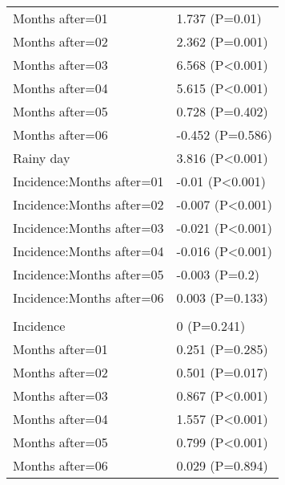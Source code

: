\documentclass[]{article}
\begin{document}
\begin{longtable}[t]{ll}
\hspace{1em}Months after=01 & 1.737 (P=0.01)\\
\hspace{1em}Months after=02 & 2.362 (P=0.001)\\
\hspace{1em}Months after=03 & 6.568 (P<0.001)\\
\hspace{1em}Months after=04 & 5.615 (P<0.001)\\
\hspace{1em}Months after=05 & 0.728 (P=0.402)\\
\hspace{1em}Months after=06 & -0.452 (P=0.586)\\
\hspace{1em}Rainy day & 3.816 (P<0.001)\\
\hspace{1em}Incidence:Months after=01 & -0.01 (P<0.001)\\
\hspace{1em}Incidence:Months after=02 & -0.007 (P<0.001)\\
\hspace{1em}Incidence:Months after=03 & -0.021 (P<0.001)\\
\hspace{1em}Incidence:Months after=04 & -0.016 (P<0.001)\\
\hspace{1em}Incidence:Months after=05 & -0.003 (P=0.2)\\
\hspace{1em}Incidence:Months after=06 & 0.003 (P=0.133)\\
\addlinespace[1.5em]
\multicolumn{2}{l}{\textbf{Temporary field worker}}\\
\hspace{1em}Incidence & 0 (P=0.241)\\
\hspace{1em}Months after=01 & 0.251 (P=0.285)\\
\hspace{1em}Months after=02 & 0.501 (P=0.017)\\
\hspace{1em}Months after=03 & 0.867 (P<0.001)\\
\hspace{1em}Months after=04 & 1.557 (P<0.001)\\
\hspace{1em}Months after=05 & 0.799 (P<0.001)\\
\hspace{1em}Months after=06 & 0.029 (P=0.894)\\

\end{longtable}
\end{document}
